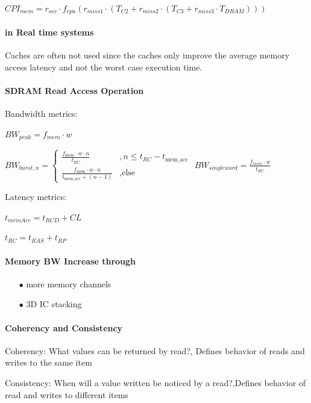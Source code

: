 \documentclass[fontsize=8pt]{scrartcl}
\begin{document}
\begin{multicols*}{4}
\noindent
$CPI_{mem} = r_{acc} \cdot f_{cpu}(r_{miss1} \cdot (T_{C2} + r_{miss2} \cdot (T_{C3} + r_{miss3} \cdot T_{DRAM})))$

\paragraph{in Real time systems} Caches are often not used since the caches only improve the average memory access latency and not the worst case execution time.

\paragraph{SDRAM Read Access Operation} \mbox{}   %

\noindent
Bandwidth metrics:

\noindent
$BW_{peak} = f_{mem} \cdot w$

\noindent
$BW_{burst,n} = 
\begin{cases}
\frac{f_{\text{mem}} \cdot w \cdot n}{t_{RC}} & , n \leq t_{RC} - t_{\text{mem\_acc}} \\[2ex]
    \frac{f_{\text{mem}} \cdot w \cdot n}{t_{\text{mem\_acc}} + (n-1)} & , \text{else}
\end{cases}$
$BW_{single word} = \frac{f_{mem} \cdot w}{t_{RC}}$

\noindent
Latency metrics:

\noindent

$t_{memAcc} = t_{RCD} + CL$

$t_{RC} = t_{RAS} + t_{RP}$

\paragraph{Memory BW Increase through}

\begin{enumerate}
  \item[$\bullet$] more memory channels
  \item[$\bullet$] 3D IC stacking
\end{enumerate}

\paragraph{Coherency and Consistency}

Coherency: What values can be returned by read?, Defines behavior of reads and writes to the same item

Consistency: When will a value written be noticed by a read?,Defines behavior of read and writes to different items


\end{multicols*}
\end{document}
